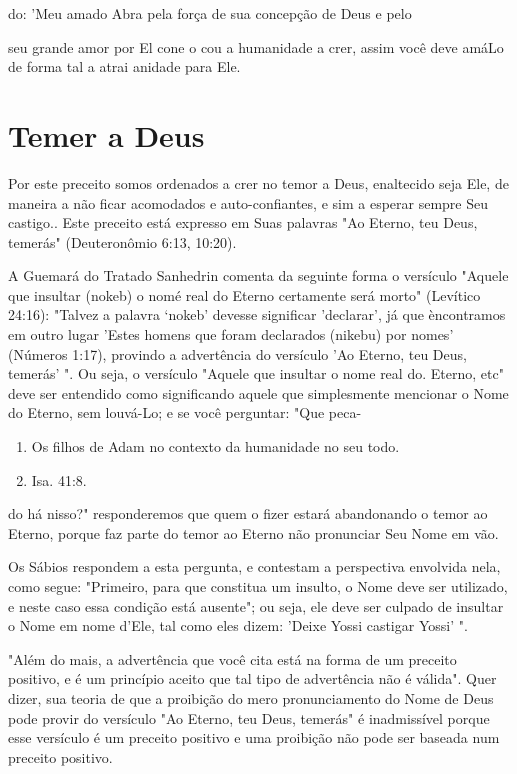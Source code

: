 do: 'Meu amado Abra pela força de sua concepção de Deus e pelo

seu grande amor por El cone o cou a humanidade a crer, assim você deve
amá­Lo de forma tal a atrai anidade para Ele.

\section{Temer a Deus}

Por este preceito somos ordenados a crer no temor a Deus, enalteci­do
seja Ele, de maneira a não ficar acomodados e auto-confiantes, e sim a
espe­rar sempre Seu castigo.. Este preceito está expresso em Suas
palavras "Ao Eter­no, teu Deus, temerás" (Deuteronômio 6:13, 10:20).

A Guemará do Tratado Sanhedrin comenta da seguinte forma o ver­sículo
"Aquele que insultar (nokeb) o nomé real do Eterno certamente será
mor­to" (Levítico 24:16): "Talvez a palavra `nokeb' devesse significar
'declarar', já que èncontramos em outro lugar 'Estes homens que foram
declarados (nikebu) por nomes' (Números 1:17), provindo a advertência do
versículo 'Ao Eterno, teu Deus, temerás' ". Ou seja, o versículo "Aquele
que insultar o nome real do. Eterno, etc" deve ser
entendido como significando aquele que simplesmente mencionar o Nome do
Eterno, sem louvá-Lo; e se você perguntar: "Que peca-

\begin{enumerate}
\def\labelenumi{\arabic{enumi}.}
\setcounter{enumi}{26}
\item
 
 Os filhos de Adam no contexto da humanidade no seu todo.
 
\item
 
 Isa. 41:8.
 
\end{enumerate}




do há nisso?" responderemos que quem o fizer estará abandonando o temor
ao Eterno, porque faz parte do temor ao Eterno não pronunciar Seu Nome
em vão.

Os Sábios respondem a esta pergunta, e contestam a perspectiva
en­volvida nela, como segue: "Primeiro, para que constitua um insulto, o
Nome deve ser utilizado, e neste caso essa condição está ausente"; ou
seja, ele deve ser culpado de insultar o Nome em nome d'Ele, tal como
eles dizem: 'Deixe Yossi castigar Yossi' ".

"Além do mais, a advertência que você cita está na forma de um pre­ceito
positivo, e é um princípio aceito que tal tipo de advertência não é
váli­da". Quer dizer, sua teoria de que a proibição do mero
pronunciamento do Nome de Deus pode provir do versículo "Ao Eterno, teu
Deus, temerás" é inad­missível porque esse versículo é um preceito
positivo e uma proibição não po­de ser baseada num preceito positivo.

